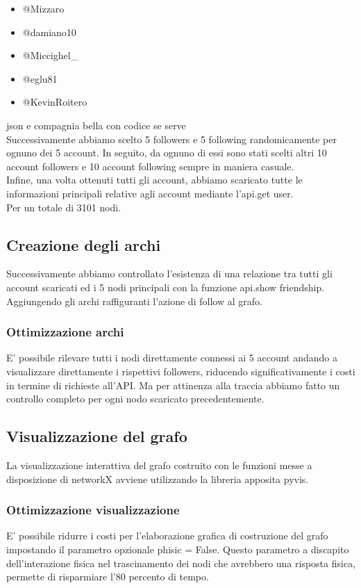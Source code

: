 \documentclass[a4paper,11pt]{report}
\begin{document}
\begin{itemize}
\item @Mizzaro
\item @damiano10
\item @Miccighel\_
\item @eglu81
\item @KevinRoitero
 \end{itemize}
json e compagnia bella con codice se serve \\
\setlength{\parindent}{0pt} 
Successivamente abbiamo scelto 5 followers e 5 following randomicamente per ognuno dei 5 account. In seguito, da ognuno di essi sono stati scelti altri 10 account followers e 10 account following sempre in maniera casuale.\\

Infine, una volta ottenuti tutti gli account, abbiamo scaricato tutte le informazioni principali relative agli account mediante l'api.get user.\\
Per un totale di 3101 nodi.
\subsection{Creazione degli archi}
Successivamente abbiamo controllato l'esistenza di una relazione tra tutti gli account scaricati ed i 5 nodi principali con la funzione api.show friendship. Aggiungendo gli archi raffiguranti l'azione di follow al grafo.
\subsubsection{Ottimizzazione archi}
E' possibile rilevare tutti i nodi direttamente connessi ai 5 account andando a visualizzare direttamente i rispettivi followers, riducendo significativamente i costi in termine di richieste all'API. Ma per attinenza alla traccia abbiamo fatto un controllo completo per ogni nodo scaricato precedentemente.

\subsection{Visualizzazione del grafo}
La visualizzazione interattiva del grafo costruito con le funzioni messe a disposizione di networkX avviene utilizzando la libreria apposita pyvis.
\subsubsection{Ottimizzazione visualizzazione}
E' possibile ridurre i costi per l'elaborazione grafica di costruzione del grafo impostando il parametro opzionale phisic = False. Questo parametro a discapito dell'interazione fisica nel trascinamento  dei nodi che avrebbero una risposta fisica, permette di risparmiare l'80 percento di tempo.
\end{document}
